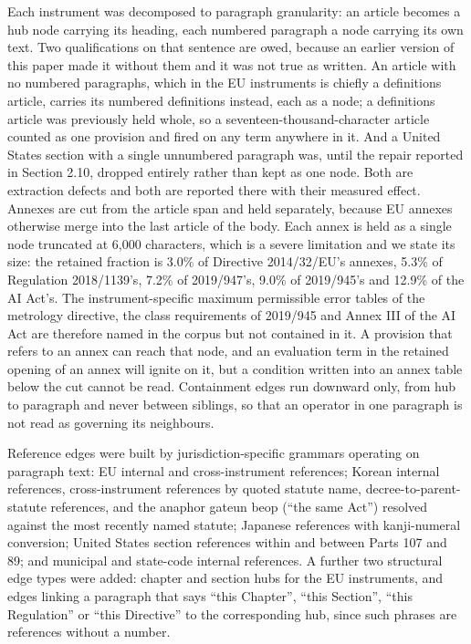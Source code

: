 Each instrument was decomposed to paragraph granularity: an article becomes a hub node carrying its heading, each numbered paragraph a node carrying its own text. Two qualifications on that sentence are owed, because an earlier version of this paper made it without them and it was not true as written. An article with no numbered paragraphs, which in the EU instruments is chiefly a definitions article, carries its numbered definitions instead, each as a node; a definitions article was previously held whole, so a seventeen-thousand-character article counted as one provision and fired on any term anywhere in it. And a United States section with a single unnumbered paragraph was, until the repair reported in Section 2.10, dropped entirely rather than kept as one node. Both are extraction defects and both are reported there with their measured effect. Annexes are cut from the article span and held separately, because EU annexes otherwise merge into the last article of the body. Each annex is held as a single node truncated at 6,000 characters, which is a severe limitation and we state its size: the retained fraction is 3.0\% of Directive 2014/32/EU's annexes, 5.3\% of Regulation 2018/1139's, 7.2\% of 2019/947's, 9.0\% of 2019/945's and 12.9\% of the AI Act's. The instrument-specific maximum permissible error tables of the metrology directive, the class requirements of 2019/945 and Annex III of the AI Act are therefore named in the corpus but not contained in it. A provision that refers to an annex can reach that node, and an evaluation term in the retained opening of an annex will ignite on it, but a condition written into an annex table below the cut cannot be read. Containment edges run downward only, from hub to paragraph and never between siblings, so that an operator in one paragraph is not read as governing its neighbours.

Reference edges were built by jurisdiction-specific grammars operating on paragraph text: EU internal and cross-instrument references; Korean internal references, cross-instrument references by quoted statute name, decree-to-parent-statute references, and the anaphor gateun beop (``the same Act'') resolved against the most recently named statute; Japanese references with kanji-numeral conversion; United States section references within and between Parts 107 and 89; and municipal and state-code internal references. A further two structural edge types were added: chapter and section hubs for the EU instruments, and edges linking a paragraph that says ``this Chapter'', ``this Section'', ``this Regulation'' or ``this Directive'' to the corresponding hub, since such phrases are references without a number.

